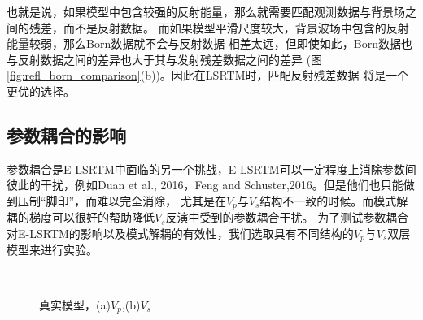 也就是说，如果模型中包含较强的反射能量，那么就需要匹配观测数据与背景场之间的残差，而不是反射数据。
而如果模型平滑尺度较大，背景波场中包含的反射能量较弱，那么Born数据就不会与反射数据
相差太远，但即使如此，Born数据也与反射数据之间的差异也大于其与发射残差数据之间的差异
(图\ref{fig:refl_born_comparison}(b))。因此在LSRTM时，匹配反射残差数据
将是一个更优的选择。
\subsection{参数耦合的影响}
参数耦合是E-LSRTM中面临的另一个挑战，E-LSRTM可以一定程度上消除参数间
彼此的干扰，例如Duan et al., 2016\cite{Duan2016}，Feng and
Schuster,2016\cite{Feng2016}。但是他们也只能做到压制“脚印”，而难以完全消除，
尤其是在$V_p$与$V_s$结构不一致的时候。而模式解耦的梯度可以很好的帮助降低$V_s$反演中受到的参数耦合干扰。
为了测试参数耦合对E-LSRTM的影响以及模式解耦的有效性，我们选取具有不同结构的$V_p$与$V_s$双层模型来进行实验。
\begin{figure}
   \centering
   \\
   \caption{真实模型，(a)$V_p$,(b)$V_s$}
   \label{fig:tradeoffModel}
\end{figure}
